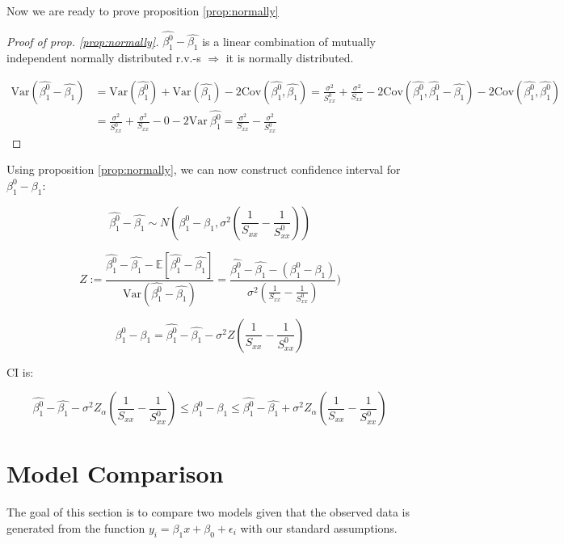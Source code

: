 \documentclass[12pt,a4paper,oneside]{book} %
\newcommand{\E}{\mathbb{E}}
\newcommand{\Var}{\mathrm{Var}}
\newcommand{\Cov}{\mathrm{Cov}}
\begin{document}
	Now we are ready to prove proposition \ref{prop:normally}
\begin{proof}[Proof of prop. \ref{prop:normally}]
	$\hat{\beta_1^0}-\hat{\beta_1}$ is a linear combination of mutually independent normally distributed r.v.-s $\Rightarrow$ it is normally distributed.
	
	
	\begin{align*}
		\Var (\hat{\beta_1^0}-\hat{\beta_1})&=\Var(\hat{\beta_1^0}) + \Var(\hat{\beta_1}) - 2 \Cov (\hat{\beta_1^0},\hat{\beta_1}) =\frac{\sigma^2}{S_{xx}^0}+\frac{\sigma^2}{S_{xx}}-2 \Cov (\hat{\beta_1^0},\hat{\beta_1^0}-\hat{\beta_1})-2 \Cov (\hat{\beta_1^0},\hat{\beta_1^0}) \\
		&= \frac{\sigma^2}{S_{xx}^0}+\frac{\sigma^2}{S_{xx}} - 0 -2 \Var \ \hat{\beta_1^0}=\frac{\sigma^2}{S_{xx}}-\frac{\sigma^2}{S_{xx}^0}
	\end{align*}
\end{proof}
	
Using proposition \ref{prop:normally}, we can now construct confidence interval for $\beta_1^0-\beta_1$:

\[
			\hat{\beta_1^0}-\hat{\beta_1} \sim N(\beta_1^0-\beta_1, \sigma^2(\frac{1}{S_{xx}}-\frac{1}{S_{xx}^0}))
\]

\[
	Z := \frac{\hat{\beta_1^0}-\hat{\beta_1}-\E [\hat{\beta_1^0}-\hat{\beta_1}]}{\Var (\hat{\beta_1^0}-\hat{\beta_1})}= \frac{\hat{\beta_1^0}-\hat{\beta_1}-(\beta_1^0-\beta_1)}{\sigma^2(\frac{1}{S_{xx}}-\frac{1}{S_{xx}^0})})
\]

\[
	\beta_1^0-\beta_1= \hat{\beta_1^0}-\hat{\beta_1} - \sigma^2 Z(\frac{1}{S_{xx}}-\frac{1}{S_{xx}^0})
\]

CI is:

\begin{equation}
\hat{\beta_1^0}-\hat{\beta_1} - \sigma^2 Z_{\alpha}(\frac{1}{S_{xx}}-\frac{1}{S_{xx}^0}) \leq \beta_1^0-\beta_1 \leq \hat{\beta_1^0}-\hat{\beta_1} + \sigma^2 Z_{\alpha}(\frac{1}{S_{xx}}-\frac{1}{S_{xx}^0})
\end{equation}




\section{Model Comparison}

The goal of this section is to compare two models given that the observed data is generated from the function $y_i = \beta_1 x + \beta_0 + \epsilon_i$ with our standard assumptions. 
\end{document}
